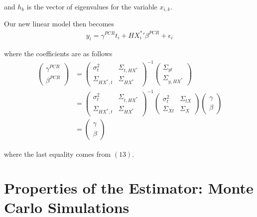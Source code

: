 \documentclass[12pt]{article}
\begin{document}
        and $h_k$ is the vector of eigenvalues for the variable $x_{i,k}$.

        Our new linear model then becomes
        \begin{align}
            y_i = \gamma^{PCR} t_i + H{X^*_i}'\beta^{PCR} + \epsilon_i
        \end{align}

        where the coefficients are as follows
        \begin{align}
            \left(\begin{array}{l}
            {\gamma}^{PCR} \\
            {\beta}^{PCR}
            \end{array}\right)&=\left(\begin{array}{cc}
            {\sigma}^2_{t} & \Sigma_{t,HX^*} \\
            \Sigma_{HX^*,t} & {\Sigma}_{HX^*}
            \end{array}\right)^{-1}\left(\begin{array}{c}
            \Sigma_{yt} \\
            \Sigma_{y,HX^*}
            \end{array}\right)\\
            &=\left(\begin{array}{cc}
            {\sigma}^2_{t} & \Sigma_{t,HX^*} \\
            \Sigma_{HX^*,t} & {\Sigma}_{HX^*}
            \end{array}\right)^{-1}\left(\begin{array}{cc}
            {\sigma}^2_{t} & \Sigma_{tX} \\
            \Sigma_{Xt} & {\Sigma}_{X}
            \end{array}\right)\left(\begin{array}{l}
            {\gamma} \\
            {\beta}
            \end{array}\right)\\
            &=\left(\begin{array}{l}
            {\gamma} \\
            {\beta}
            \end{array}\right)
        \end{align}

        where the last equality comes from $(13)$.

    \section*{Properties of the Estimator: Monte Carlo Simulations}
\end{document}
